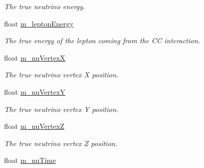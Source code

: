\begin{DoxyCompactItemize}
\begin{DoxyCompactList}\small\item\em The true neutrino energy. \end{DoxyCompactList}\item 
float \hyperlink{classflashmatch_1_1FlashMatchingTool_a9b34756c62ad017bee3da0c5d19330d9}{m\+\_\+lepton\+Energy}\hypertarget{classflashmatch_1_1FlashMatchingTool_a9b34756c62ad017bee3da0c5d19330d9}{}\label{classflashmatch_1_1FlashMatchingTool_a9b34756c62ad017bee3da0c5d19330d9}

\begin{DoxyCompactList}\small\item\em The true energy of the lepton coming from the CC interaction. \end{DoxyCompactList}\item 
float \hyperlink{classflashmatch_1_1FlashMatchingTool_abb21852617cec0a27cda3462a0a11bff}{m\+\_\+nu\+VertexX}\hypertarget{classflashmatch_1_1FlashMatchingTool_abb21852617cec0a27cda3462a0a11bff}{}\label{classflashmatch_1_1FlashMatchingTool_abb21852617cec0a27cda3462a0a11bff}

\begin{DoxyCompactList}\small\item\em The true neutrino vertex X position. \end{DoxyCompactList}\item 
float \hyperlink{classflashmatch_1_1FlashMatchingTool_a356775f0a1f6304ac89ed0d53d671f51}{m\+\_\+nu\+VertexY}\hypertarget{classflashmatch_1_1FlashMatchingTool_a356775f0a1f6304ac89ed0d53d671f51}{}\label{classflashmatch_1_1FlashMatchingTool_a356775f0a1f6304ac89ed0d53d671f51}

\begin{DoxyCompactList}\small\item\em The true neutrino vertex Y position. \end{DoxyCompactList}\item 
float \hyperlink{classflashmatch_1_1FlashMatchingTool_a085ef14efb0bbfd5d6a2daa902f79c64}{m\+\_\+nu\+VertexZ}\hypertarget{classflashmatch_1_1FlashMatchingTool_a085ef14efb0bbfd5d6a2daa902f79c64}{}\label{classflashmatch_1_1FlashMatchingTool_a085ef14efb0bbfd5d6a2daa902f79c64}

\begin{DoxyCompactList}\small\item\em The true neutrino vertex Z position. \end{DoxyCompactList}\item 
float \hyperlink{classflashmatch_1_1FlashMatchingTool_a6ea1d944847273ae6ce6f0ef5fd82497}{m\+\_\+nu\+Time}\hypertarget{classflashmatch_1_1FlashMatchingTool_a6ea1d944847273ae6ce6f0ef5fd82497}{}\label{classflashmatch_1_1FlashMatchingTool_a6ea1d944847273ae6ce6f0ef5fd82497}


\end{DoxyCompactItemize}
